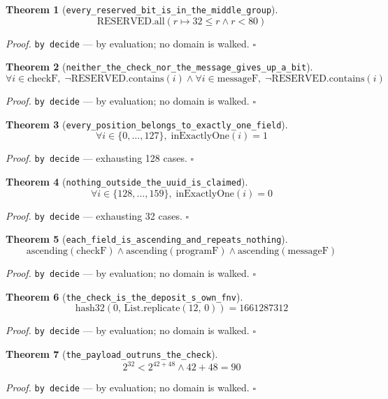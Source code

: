 \documentclass[11pt]{article}
\newtheorem{theorem}{Theorem}[section]
\begin{document}
\begin{theorem}[\texttt{every\_reserved\_bit\_is\_in\_the\_middle\_group}]
\[ \mathrm{RESERVED.all}\mathopen{}\left(r \mapsto 32 \le r \land r < 80\right) \]
\end{theorem}
\noindent\emph{Proof.} \texttt{by decide} --- by evaluation; no domain is walked. \hfill$\square$

\begin{theorem}[\texttt{neither\_the\_check\_nor\_the\_message\_gives\_up\_a\_bit}]
\[ \forall i \in \mathrm{checkF},\; \lnot \mathrm{RESERVED.contains}\mathopen{}\left(i\right) \land \forall i \in \mathrm{messageF},\; \lnot \mathrm{RESERVED.contains}\mathopen{}\left(i\right) \]
\end{theorem}
\noindent\emph{Proof.} \texttt{by decide} --- by evaluation; no domain is walked. \hfill$\square$

\begin{theorem}[\texttt{every\_position\_belongs\_to\_exactly\_one\_field}]
\[ \forall i \in \{0,\dots,127\},\; \mathrm{inExactlyOne}\mathopen{}\left(i\right) = 1 \]
\end{theorem}
\noindent\emph{Proof.} \texttt{by decide} --- exhausting 128 cases. \hfill$\square$

\begin{theorem}[\texttt{nothing\_outside\_the\_uuid\_is\_claimed}]
\[ \forall i \in \{128,\dots,159\},\; \mathrm{inExactlyOne}\mathopen{}\left(i\right) = 0 \]
\end{theorem}
\noindent\emph{Proof.} \texttt{by decide} --- exhausting 32 cases. \hfill$\square$

\begin{theorem}[\texttt{each\_field\_is\_ascending\_and\_repeats\_nothing}]
\[ \mathrm{ascending}\mathopen{}\left(\mathrm{checkF}\right) \land \mathrm{ascending}\mathopen{}\left(\mathrm{programF}\right) \land \mathrm{ascending}\mathopen{}\left(\mathrm{messageF}\right) \]
\end{theorem}
\noindent\emph{Proof.} \texttt{by decide} --- by evaluation; no domain is walked. \hfill$\square$

\begin{theorem}[\texttt{the\_check\_is\_the\_deposit\_s\_own\_fnv}]
\[ \mathrm{hash32}\mathopen{}\left(0,\,\mathrm{List.replicate}\mathopen{}\left(12,\,0\right)\right) = 1661287312 \]
\end{theorem}
\noindent\emph{Proof.} \texttt{by decide} --- by evaluation; no domain is walked. \hfill$\square$

\begin{theorem}[\texttt{the\_payload\_outruns\_the\_check}]
\[ 2^{32} < 2^{42 + 48} \land 42 + 48 = 90 \]
\end{theorem}
\noindent\emph{Proof.} \texttt{by decide} --- by evaluation; no domain is walked. \hfill$\square$
\end{document}
